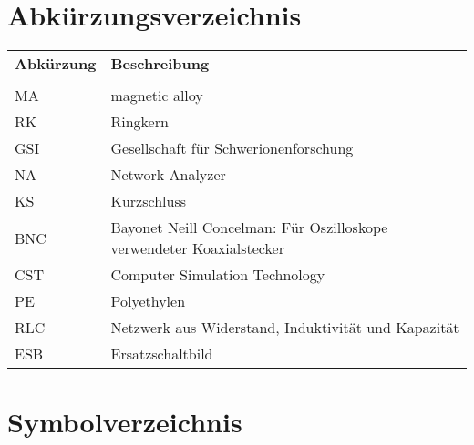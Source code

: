 \chapter*{Abk\"urzungsverzeichnis}
\begin{tabular}{p{} p{}}
\textbf{Abk\"urzung} & \textbf{Beschreibung} \\
 & \\
MA & magnetic alloy \\
RK & Ringkern \\
GSI & Gesellschaft f\"ur Schwerionenforschung \\
NA & Network Analyzer\\
KS & Kurzschluss \\
BNC & Bayonet Neill Concelman: F\"ur Oszilloskope verwendeter Koaxialstecker \\
CST & Computer Simulation Technology \\
PE & Polyethylen \\
RLC & Netzwerk aus Widerstand, Induktivit\"at und Kapazit\"at \\
ESB & Ersatzschaltbild\\
\end{tabular}

\cleardoublepage

\chapter*{Symbolverzeichnis}


